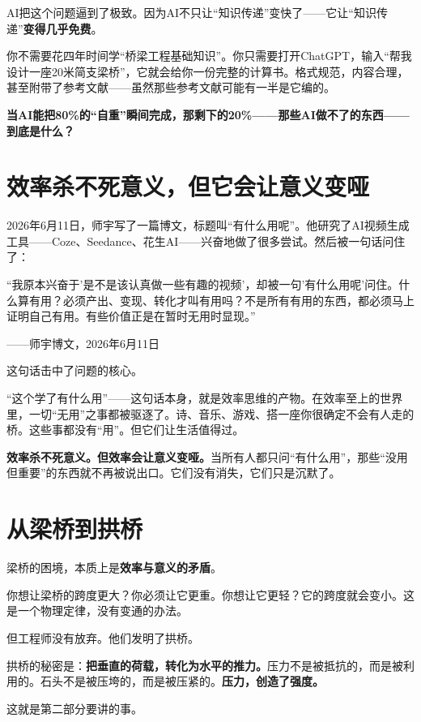 AI把这个问题逼到了极致。因为AI不只让``知识传递''变快了——它让``知识传递''\textbf{变得几乎免费}。

你不需要花四年时间学``桥梁工程基础知识''。你只需要打开ChatGPT，输入``帮我设计一座20米简支梁桥''，它就会给你一份完整的计算书。格式规范，内容合理，甚至附带了参考文献——虽然那些参考文献可能有一半是它编的。

\textbf{当AI能把80\%的``自重''瞬间完成，那剩下的20\%——那些AI做不了的东西——到底是什么？}

\section{效率杀不死意义，但它会让意义变哑}

2026年6月11日，师宇写了一篇博文，标题叫``有什么用呢''。他研究了AI视频生成工具——Coze、Seedance、花生AI——兴奋地做了很多尝试。然后被一句话问住了：

\begin{shiyu-inline}
``我原本兴奋于'是不是该认真做一些有趣的视频'，却被一句'有什么用呢'问住。什么算有用？必须产出、变现、转化才叫有用吗？不是所有有用的东西，都必须马上证明自己有用。有些价值正是在暂时无用时显现。''

\hfill ——师宇博文，2026年6月11日
\end{shiyu-inline}

这句话击中了问题的核心。

``这个学了有什么用''——这句话本身，就是效率思维的产物。在效率至上的世界里，一切``无用''之事都被驱逐了。诗、音乐、游戏、搭一座你很确定不会有人走的桥。这些事都没有``用''。但它们让生活值得过。

\textbf{效率杀不死意义。但效率会让意义变哑。}当所有人都只问``有什么用''，那些``没用但重要''的东西就不再被说出口。它们没有消失，它们只是沉默了。

\section{从梁桥到拱桥}

梁桥的困境，本质上是\textbf{效率与意义的矛盾}。

你想让梁桥的跨度更大？你必须让它更重。你想让它更轻？它的跨度就会变小。这是一个物理定律，没有变通的办法。

但工程师没有放弃。他们发明了拱桥。

拱桥的秘密是：\textbf{把垂直的荷载，转化为水平的推力。}压力不是被抵抗的，而是被利用的。石头不是被压垮的，而是被压紧的。\textbf{压力，创造了强度。}

这就是第二部分要讲的事。

